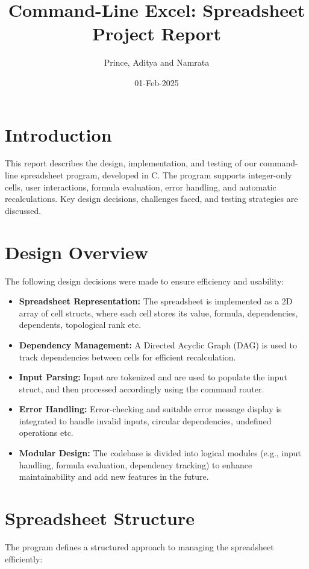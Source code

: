 \documentclass{article}
\title{Command-Line Excel: Spreadsheet Project Report}
\author{Prince, Aditya and Namrata}
\date{01-Feb-2025}
\begin{document}
\maketitle

\section{Introduction}
This report describes the design, implementation, and testing of our command-line spreadsheet program, developed in C. The program supports integer-only cells, user interactions, formula evaluation, error handling, and automatic recalculations. Key design decisions, challenges faced, and testing strategies are discussed.

\section{Design Overview}
The following design decisions were made to ensure efficiency and usability:
\begin{itemize}
    \item \textbf{Spreadsheet Representation:} The spreadsheet is implemented as a 2D array of cell structs, where each cell stores its value, formula, dependencies, dependents, topological rank etc.
    \item \textbf{Dependency Management:} A Directed Acyclic Graph (DAG) is used to track dependencies between cells for efficient recalculation.
    \item \textbf{Input Parsing:} Input are tokenized and are used to populate the input struct, and then processed accordingly using the command router.
    \item \textbf{Error Handling:} Error-checking and suitable error message display is integrated to handle invalid inputs, circular dependencies, undefined operations etc.
    \item \textbf{Modular Design:} The codebase is divided into logical modules (e.g., input handling, formula evaluation, dependency tracking) to enhance maintainability and add new features in the future.
\end{itemize}

\section{Spreadsheet Structure}
The program defines a structured approach to managing the spreadsheet efficiently:
\end{document}
